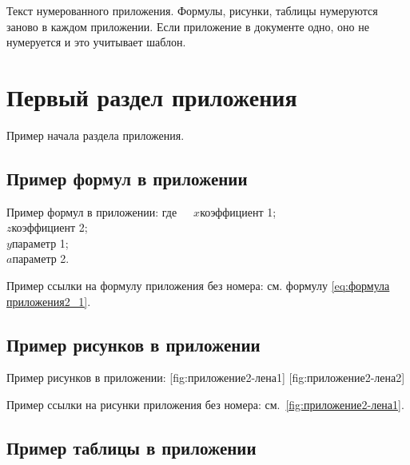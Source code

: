 \newpage
{}
\setcounter{equation}{0} %
\setcounter{table}{0} %
\setcounter{illustration}{0} %
\setcounter{section}{0} %

Текст нумерованного приложения. Формулы, рисунки, таблицы нумеруются заново в каждом приложении. Если приложение в документе одно, оно не нумеруется и это учитывает шаблон.
\\
\section{Первый раздел приложения}

Пример начала раздела приложения.

\subsection{Пример формул в приложении}

Пример формул в приложении:
%
\noindent где~~~$x$\ndash коэффициент 1; \\
\indent $z$\ndash коэффициент 2;\\
\indent $y$\ndash параметр 1;\\
\indent $a$\ndash параметр 2.

Пример ссылки на формулу приложения без номера: см. формулу \ref{eq:формула приложения2_1}.

\subsection{Пример рисунков в приложении}

Пример рисунков в приложении:
[fig:приложение2-лена1]
[fig:приложение2-лена2]

Пример ссылки на рисунки приложения без номера: см.~\ref{fig:приложение2-лена1}.

\subsection{Пример таблицы в приложении}

